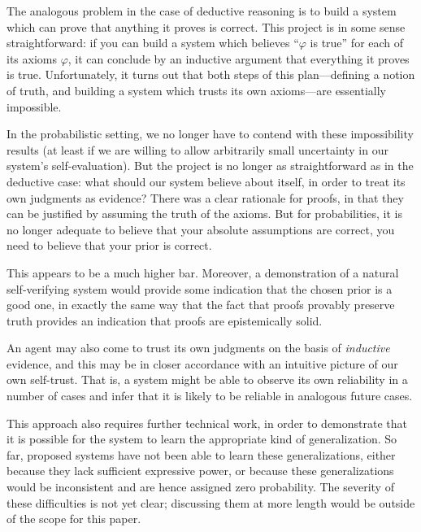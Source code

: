 \documentclass[12pt]{article}
\theoremstyle{definition}
\newcommand{\vp}{\varphi}
\begin{document}
The analogous problem in the case of deductive reasoning is to build
a system which can prove that anything it proves is correct.
This project is in some sense straightforward:
if you can build a system which believes ``$\vp$ is true'' for
each of its axioms $\vp$, it can conclude by an inductive
argument that everything it proves is true.
Unfortunately, it turns out that both steps of this plan---defining
a notion of truth, and building a system which trusts its own axioms---are
essentially impossible.

In the probabilistic setting, we no longer have to contend with these
impossibility results (at least if we are willing to allow arbitrarily
small uncertainty in our system's self-evaluation).
But the project is no longer as straightforward as in the deductive case:
what should our system believe about itself, in order to treat
its own judgments as evidence? There was a clear rationale for
proofs, in that they can be justified by assuming the truth of the axioms.
But for probabilities, it is no longer adequate to believe that your
absolute assumptions are correct, you need to believe that your
prior is correct.

This appears to be a much higher bar.
Moreover, a demonstration of a natural self-verifying system
would provide some indication that the chosen prior is a good one,
in exactly the same way that the fact that proofs provably preserve truth provides
an indication that proofs are epistemically solid.

An agent may also come to trust its own judgments on the basis
of \emph{inductive} evidence, and this may be in closer accordance
with an intuitive picture of our own self-trust.
That is, a system might be able to observe its own reliability
in a number of cases and infer that it is likely to be reliable
in analogous future cases.

This approach also requires further technical work,
in order to demonstrate that it is possible for the system
to learn the appropriate kind of generalization.
So far, proposed systems have not been able to learn these generalizations,
either because they lack sufficient expressive power, or because
these generalizations would be inconsistent and are hence assigned
zero probability.
The severity of these difficulties is not yet clear;
discussing them at more length would be outside of the scope for this paper.
\end{document}
